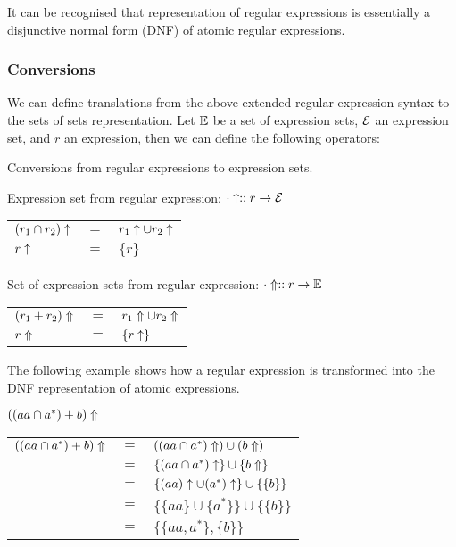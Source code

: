 It can be recognised that representation of regular expressions is essentially a
disjunctive normal form (DNF) of atomic regular expressions.

\subsubsection{Conversions}

We can define translations from the above extended regular expression syntax to
the sets of sets representation. Let $\mathbb{E}$ be a set of expression sets,
$\mathcal{E}$ an expression set, and $r$ an expression, then we can define the
following operators:

\begin{defn}
   \label{defn-re2esets}
   Conversions from regular expressions to expression sets.

   Expression set from regular expression:
   $\cdot\uparrow :: r \to \mathcal{E}$

   \begin{tabular}{lll}
      $(r_1 \cap r_2)\uparrow$	& $=$	& $r_1\uparrow \cup r_2\uparrow$	\\
      $r\uparrow$			& $=$	& $\{r\}$			\\
   \end{tabular}

   Set of expression sets from regular expression:
   $\cdot\Uparrow :: r \to \mathbb{E}$

   \begin{tabular}{lll}
      $(r_1 + r_2)\Uparrow$	& $=$	& $r_1\Uparrow \cup r_2\Uparrow$	\\
      $r\Uparrow$		& $=$	& $\{r\uparrow\}$			\\
   \end{tabular}
\end{defn}

The following example shows how a regular expression is transformed into the DNF
representation of atomic expressions.

\begin{eg}
   $((aa \cap a^*) + b)\Uparrow$

   \begin{tabular}{lll}
      $((aa \cap a^*) + b)\Uparrow$
      & $=$	& $((aa \cap a^*)\Uparrow) \cup (b\Uparrow)$		\\
      & $=$	& $\{(aa \cap a^*)\uparrow\} \cup \{b\Uparrow\}$		\\
      & $=$	& $\{(aa)\uparrow \cup (a^*)\uparrow\} \cup \{\{b\}\}$	\\
      & $=$	& $\{\{aa\} \cup \{a^*\}\} \cup \{\{b\}\}$			\\
      & $=$	& $\{\{aa, a^*\}, \{b\}\}$					\\
   \end{tabular}
\end{eg}

